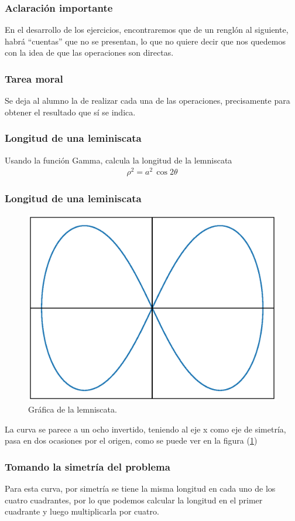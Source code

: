\documentclass[12pt]{beamer}
\begin{document}
\begin{frame}
\frametitle{Aclaración importante}
En el desarrollo de los ejercicios, encontraremos que de un renglón al siguiente, habrá \enquote{cuentas} que no se presentan, lo que no quiere decir que nos quedemos con la idea de que las operaciones son directas.
\end{frame}
\begin{frame}
\frametitle{Tarea moral}
Se deja al alumno la  de realizar cada una de las operaciones, precisamente para obtener el resultado que sí se indica.
\end{frame}
\begin{frame}
\frametitle{Longitud de una leminiscata}
Usando la función Gamma, calcula la longitud de la lemniscata
\begin{align*}
\rho^{2} = a^{2} \, \cos 2 \theta
\end{align*}
\end{frame}
\begin{frame}
\frametitle{Longitud de una leminiscata}
\begin{figure}
    \centering
    \includegraphics[scale=0.35]{Imagenes/plot_leminscata_01.eps}
    \caption{Gráfica de la lemniscata.}
    \label{fig:figura_lemniscata}
\end{figure}
La curva se parece a un ocho invertido, teniendo al eje x como eje de simetría, pasa en dos ocasiones por el origen, como se puede ver en la figura (\ref{fig:figura_lemniscata})
\end{frame}
\begin{frame}
\frametitle{Tomando la simetría del problema}
Para esta curva, por simetría se tiene la misma longitud en cada uno de los cuatro cuadrantes, por lo que podemos calcular la longitud en el primer cuadrante y luego multiplicarla por cuatro.
\end{frame}
\end{document}
